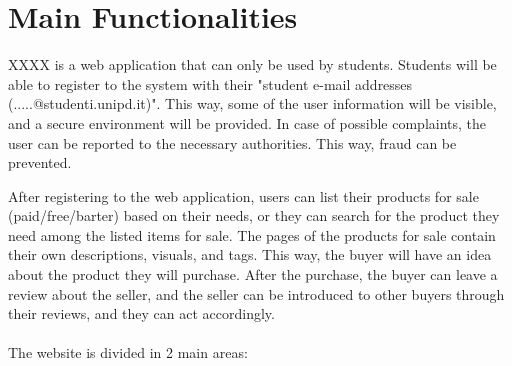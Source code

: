 \section{Main Functionalities}

\hspace{5mm} XXXX is a web application that can only be used by students. Students will be able to register to the system with their "student e-mail addresses (.....@studenti.unipd.it)". This way, some of the user information will be visible, and a secure environment will be provided. In case of possible complaints, the user can be reported to the necessary authorities. This way, fraud can be prevented.

After registering to the web application, users can list their products for sale (paid/free/barter) based on their needs, or they can search for the product they need among the listed items for sale. The pages of the products for sale contain their own descriptions, visuals, and tags. This way, the buyer will have an idea about the product they will purchase. After the purchase, the buyer can leave a review about the seller, and the seller can be introduced to other buyers through their reviews, and they can act accordingly.
\\
\\
The website is divided in 2 main areas:
